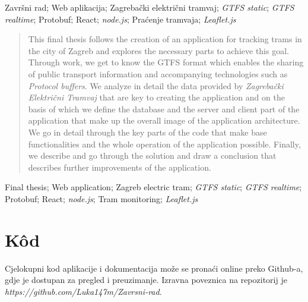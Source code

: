 \documentclass[zavrsnirad]{fer}
\begin{document}
\begin{kljucnerijeci}
  Završni rad; Web aplikacija; Zagrebački električni tramvaj; \textit{GTFS static}; \textit{GTFS realtime}; Protobuf; React; \textit{node.js}; Praćenje tramvaja; \textit{Leaflet.js}
\end{kljucnerijeci}


\begin{abstract}
	This final thesis follows the creation of an application for tracking trams in the city of Zagreb and explores the necessary parts to achieve this goal. Through work, we get to know the GTFS format which enables the sharing of public transport information and accompanying technologies such as \textit{Protocol buffers}. We analyze in detail the data provided by \textit{Zagrebački Električni Tramvaj} that are key to creating the application and on the basis of which we define the database and the server and client part of the application that make up the overall image of the application architecture. We go in detail through the key parts of the code that make base functionalities and the whole operation of the application possible. Finally, we describe and go through the solution and draw a conclusion that describes further improvements of the application.
\end{abstract}

\begin{keywords}
  Final thesis; Web application; Zagreb electric tram; \textit{GTFS static}; \textit{GTFS realtime}; Protobuf; React; \textit{node.js}; Tram monitoring; \textit{Leaflet.js}
\end{keywords}



\backmatter

\chapter{K\^od}
Cjelokupni kod aplikacije i dokumentacija može se pronaći online preko Github-a, gdje je dostupan za pregled i preuzimanje. Izravna poveznica na repozitorij je\\ \textit{https://github.com/Luka147m/Zavrsni-rad}.
\end{document}
